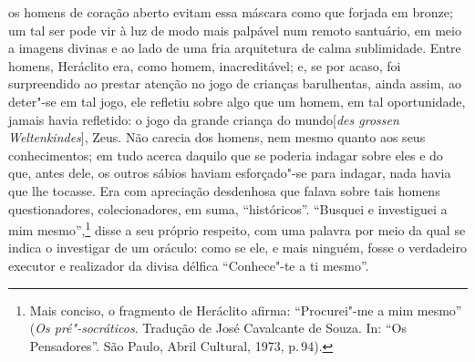    os homens de coração aberto evitam essa máscara como que forjada em
   bronze; um tal ser pode vir à luz de modo mais palpável num remoto
   santuário, em meio a imagens divinas e ao lado de uma fria arquitetura de
   calma sublimidade. Entre homens, Heráclito era, como homem, inacreditável;
   e, se por acaso, foi surpreendido ao prestar atenção no jogo de crianças
   barulhentas, ainda assim, ao deter"-se em tal jogo, ele refletiu sobre
   algo que um homem, em tal oportunidade, jamais havia refletido: o jogo da
   grande criança do mundo[\textit{des grossen Weltenkindes}], Zeus. Não
   carecia dos homens, nem mesmo quanto aos seus conhecimentos; em tudo
   acerca daquilo que se poderia indagar sobre eles e do que, antes dele, os
   outros sábios haviam esforçado"-se para indagar, nada havia que lhe
   tocasse. Era com apreciação desdenhosa que falava sobre tais homens
   questionadores, colecionadores, em suma, ``históricos''. ``Busquei e
   investiguei a mim mesmo'',\footnote{ Mais conciso, o fragmento de
   Heráclito afirma: ``Procurei"-me a mim mesmo'' (\textit{Os pré"-socráticos}. 
   Tradução de José Cavalcante de Souza. In: ``Os
   Pensadores''. São Paulo, Abril Cultural, 1973, p.\,94).} disse a seu
   próprio respeito, com uma palavra por meio da qual se indica o investigar
   de um oráculo: como se ele, e mais ninguém, fosse o verdadeiro executor e
   realizador da divisa délfica ``Conhece"-te a ti mesmo''.

